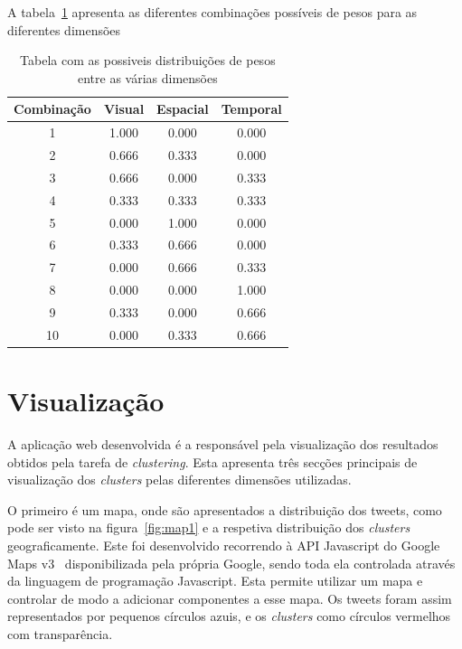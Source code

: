 A tabela~\ref{tab:pesos} apresenta as diferentes combinações possíveis de pesos para as diferentes dimensões

\begin{table}[h]
\centering
\begin{tabular}{|c|c|c|c|}
\hline
\textbf{Combinação} & \textbf{Visual} & \textbf{Espacial} & \textbf{Temporal} \\ \hline
1 & 1.000 & 0.000 & 0.000 \\ \hline
2 & 0.666 & 0.333 & 0.000 \\ \hline
3 & 0.666 & 0.000 & 0.333 \\ \hline
4 & 0.333 & 0.333 & 0.333 \\ \hline
5 & 0.000 & 1.000 & 0.000 \\ \hline
6 & 0.333 & 0.666 & 0.000 \\ \hline
7 & 0.000 & 0.666 & 0.333 \\ \hline
8 & 0.000 & 0.000 & 1.000 \\ \hline
9 & 0.333 & 0.000 & 0.666 \\ \hline
10 & 0.000 & 0.333 & 0.666 \\ \hline
\end{tabular}
\vspace{2 mm}
\caption{Tabela com as possiveis distribuições de pesos entre as várias dimensões}
\label{tab:pesos}
\end{table}

\section{Visualização}

A aplicação web desenvolvida é a responsável pela visualização dos resultados obtidos pela tarefa de \textit{clustering}. Esta apresenta três secções principais de visualização dos \textit{clusters} pelas diferentes dimensões utilizadas. 

O primeiro é um mapa, onde são apresentados a distribuição dos tweets, como pode ser visto na figura~\ref{fig:map1} e a respetiva distribuição dos \textit{clusters} geograficamente. Este foi desenvolvido recorrendo à API Javascript do Google Maps v3~\cite{googlemapsapi} disponibilizada pela própria Google, sendo toda ela controlada através da linguagem de programação Javascript. Esta permite utilizar um mapa e controlar de modo a adicionar componentes a esse mapa. Os tweets foram assim representados por pequenos círculos azuis, e os \textit{clusters} como círculos vermelhos com transparência. 

